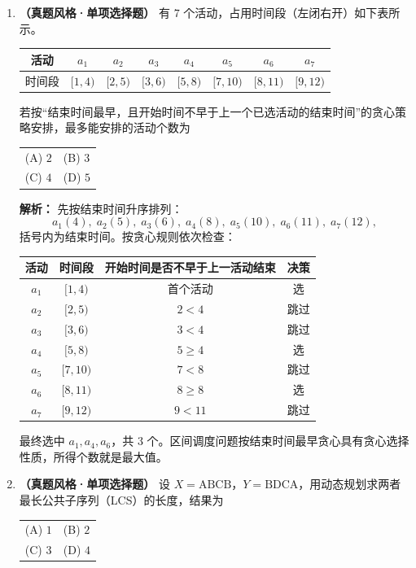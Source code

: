 \begin{enumerate}[resume]

\item \textbf{（真题风格·单项选择题）} 有 $7$ 个活动，占用时间段（左闭右开）如下表所示。
\begin{center}
\begin{tabular}{c|ccccccc}
\hline
活动 & $a_1$ & $a_2$ & $a_3$ & $a_4$ & $a_5$ & $a_6$ & $a_7$\\
\hline
时间段 & $[1,4)$ & $[2,5)$ & $[3,6)$ & $[5,8)$ & $[7,10)$ & $[8,11)$ & $[9,12)$\\
\hline
\end{tabular}
\end{center}
若按“结束时间最早，且开始时间不早于上一个已选活动的结束时间”的贪心策略安排，最多能安排的活动个数为
\begin{center}
\begin{tabular}{ll}
(A) $2$ & (B) $3$ \\[4pt]
(C) $4$ & (D) $5$
\end{tabular}
\end{center}

\ifshowsolutions\par\noindent\textbf{解析：} 先按结束时间升序排列：
\[
a_1(4),\;a_2(5),\;a_3(6),\;a_4(8),\;a_5(10),\;a_6(11),\;a_7(12),
\]
括号内为结束时间。按贪心规则依次检查：

\begin{center}
\begin{tabular}{cccc}
\hline
活动 & 时间段 & 开始时间是否不早于上一活动结束 & 决策\\
\hline
$a_1$ & $[1,4)$ & 首个活动 & 选\\
$a_2$ & $[2,5)$ & $2<4$ & 跳过\\
$a_3$ & $[3,6)$ & $3<4$ & 跳过\\
$a_4$ & $[5,8)$ & $5\ge 4$ & 选\\
$a_5$ & $[7,10)$ & $7<8$ & 跳过\\
$a_6$ & $[8,11)$ & $8\ge 8$ & 选\\
$a_7$ & $[9,12)$ & $9<11$ & 跳过\\
\hline
\end{tabular}
\end{center}

最终选中 $a_1,a_4,a_6$，共 $3$ 个。区间调度问题按结束时间最早贪心具有贪心选择性质，所得个数就是最大值。\else \answerarea[8] \fi

\item \textbf{（真题风格·单项选择题）} 设 $X=\text{ABCB}$，$Y=\text{BDCA}$，用动态规划求两者最长公共子序列（LCS）的长度，结果为
\begin{center}
\begin{tabular}{ll}
(A) $1$ & (B) $2$ \\[4pt]
(C) $3$ & (D) $4$
\end{tabular}
\end{center}


\end{enumerate}
